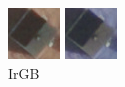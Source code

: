 \documentclass[a4paper,12pt]{article}  %
\begin{document}
\begin{figure}[H]
\begin{minipage}{0.24\textwidth}
        \includegraphics[width=\linewidth]{spektralne/irgb_budynek7.png}
        \caption*{IrGB}
    \end{minipage}
    \begin{minipage}{0.24\textwidth}
        \centering
        \includegraphics[width=\linewidth]{spektralne/rgir_budynek7.png}

\end{minipage}
\end{figure}
\end{document}
